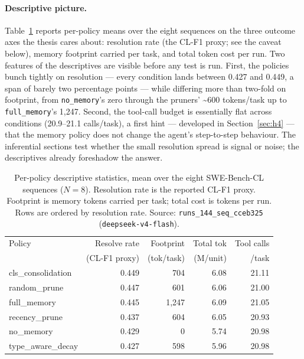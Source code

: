 \paragraph{Descriptive picture.}
Table~\ref{tab:descriptives} reports per-policy means over the eight sequences on the
three outcome axes the thesis cares about: resolution rate (the CL-F1 proxy; see the
caveat below), memory footprint carried per task, and total token cost per run. Two
features of the descriptives are visible before any test is run. First, the policies bunch
tightly on resolution --- every condition lands between 0.427 and 0.449, a span of barely
two percentage points --- while differing more than two-fold on footprint, from
\texttt{no\_memory}'s zero through the pruners' \textasciitilde 600 tokens/task up to
\texttt{full\_memory}'s 1{,}247. Second, the tool-call budget is essentially flat across
conditions (20.9--21.1 calls/task), a first hint --- developed in Section~\ref{sec:h4} ---
that the memory policy does not change the agent's step-to-step behaviour. The inferential
sections test whether the small resolution spread is signal or noise; the descriptives
already foreshadow the answer.

\begin{table}[htbp]
  \centering
  \caption{Per-policy descriptive statistics, mean over the eight SWE-Bench-CL
  sequences ($N=8$). Resolution rate is the reported CL-F1 proxy. Footprint is memory
  tokens carried per task; total cost is tokens per run. Rows are ordered by resolution
  rate. Source: \texttt{runs\_144\_seq\_cceb325} (\texttt{deepseek-v4-flash}).}
  \label{tab:descriptives}
  \begin{tabular}{lrrrr}
    \toprule
    Policy & Resolve rate & Footprint & Total tok & Tool calls \\
           & (CL-F1 proxy) & (tok/task) & (M/unit)  & /task      \\
    \midrule
    cls\_consolidation & 0.449 & 704   & 6.08 & 21.11 \\
    random\_prune      & 0.447 & 601   & 6.06 & 21.00 \\
    full\_memory       & 0.445 & 1{,}247 & 6.09 & 21.05 \\
    recency\_prune     & 0.437 & 604   & 6.05 & 20.93 \\
    no\_memory         & 0.429 & 0     & 5.74 & 20.98 \\
    type\_aware\_decay & 0.427 & 598   & 5.96 & 20.98 \\
    \bottomrule
  \end{tabular}
\end{table}


